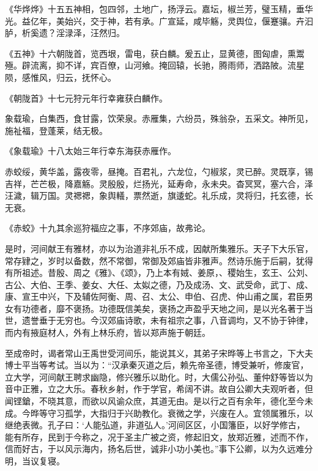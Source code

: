 \documentclass[12pt,UTF8]{ctexbook}
\begin{document}
《华烨烨》十五五神相，包四邻，土地广，扬浮云。嘉坛，椒兰芳，璧玉精，垂华光。益亿年，美始兴，交于神，若有承。广宣延，咸毕觞，灵舆位，偃蹇骧。卉汩胪，析奚遗？淫渌泽，汪然归。



《五神》十六朝陇首，览西垠，雷电，获白麟。爰五止，显黄德，图匈虐，熏鬻殛。辟流离，抑不详，宾百僚，山河飨。掩回辕，长驰，腾雨师，洒路陂。流星陨，感惟风，归云，抚怀心。



《朝陇首》十七元狩元年行幸雍获白麟作。



象载瑜，白集西，食甘露，饮荣泉。赤雁集，六纷员，殊翁杂，五采文。神所见，施祉福，登蓬莱，结无极。



《象载瑜》十八太始三年行幸东海获赤雁作。



赤蛟绥，黄华盖，露夜零，昼掩。百君礼，六龙位，勺椒浆，灵已醉。灵既享，锡吉祥，芒芒极，降嘉觞。灵殷殷，烂扬光，延寿命，永未央。杳冥冥，塞六合，泽汪濊，辑万国。灵禗禗，象舆轙，票然逝，旗逶蛇。礼乐成，灵将归，托玄德，长无衰。



《赤蛟》十九其余巡狩福应之事，不序郊庙，故弗论。



是时，河间献王有雅材，亦以为治道非礼乐不成，因献所集雅乐。天子下大乐官，常存肄之，岁时以备数，然不常御，常御及郊庙皆非雅声。然诗乐施于后嗣，犹得有所祖述。昔殷、周之《雅》、《颂》，乃上本有娀、姜原，、稷始生，玄王、公刘、古公、大伯、王季、姜女、大任、太姒之德，乃及成汤、文、武受命，武丁、成、康、宣王中兴，下及辅佐阿衡、周、召、太公、申伯、召虎、仲山甫之属，君臣男女有功德者，靡不褒扬。功德既信美矣，褒扬之声盈乎天地之间，是以光名著于当世，遗誉垂于无穷也。今汉郊庙诗歌，未有祖宗之事，八音调均，又不协于钟律，而内有掖庭材人，外有上林乐府，皆以郑声施于朝廷。



至成帝时，谒者常山王禹世受河间乐，能说其义，其弟子宋晔等上书言之，下大夫博士平当等考试。当以为：“汉承秦灭道之后，赖先帝圣德，博受兼听，修废官，立大学，河间献王聘求幽隐，修兴雅乐以助化。时，大儒公孙弘、董仲舒等皆以为音中正雅，立之大乐。春秋乡射，作于学官，希阔不讲。故自公卿大夫观听者，但闻铿鎗，不晓其意，而欲以风谕众庶，其道无由。是以行之百有余年，德化至今未成。今晔等守习孤学，大指归于兴助教化。衰微之学，兴废在人。宜领属雅乐，以继绝表微。孔子曰：‘人能弘道，非道弘人。’河间区区，小国籓臣，以好学修古，能有所存，民到于今称之，况于圣主广被之资，修起旧文，放郑近雅，述而不作，信而好古，于以风示海内，扬名后世，诚非小功小美也。”事下公卿，以为久远难分明，当议复寝。
\end{document}
